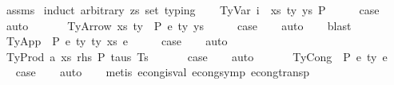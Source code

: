 \begin{isabellebody}
%
\isadelimproof
%
\endisadelimproof
%
\isatagproof
{}\isamarkupfalse%
\ assms\isanewline
{}\isamarkupfalse%
\ {\isacharparenleft}{\kern0pt}induct\ arbitrary{\isacharcolon}{\kern0pt}\ zs\ set{\isacharcolon}{\kern0pt}\ typing{\isacharparenright}{\kern0pt}\isanewline
\ \ \isamarkupfalse%
\ {\isacharparenleft}{\kern0pt}TyVar\ i\ {\isasymGamma}\ xs\ ty\ ys\ P{\isacharparenright}{\kern0pt}\isanewline
\ \ \isamarkupfalse%
\ \isamarkupfalse%
\ {\isacharquery}{\kern0pt}case\isanewline
\ \ \isamarkupfalse%
\ auto\isanewline
\ \ \isamarkupfalse%
\isanewline
{}\isamarkupfalse%
\isanewline
\ \ \isamarkupfalse%
\ {\isacharparenleft}{\kern0pt}TyArrow\ xs\ ty{}\ {\isasymGamma}\ P\ e\ ty{}\ ys{\isacharparenright}{\kern0pt}\isanewline
\ \ \isamarkupfalse%
\ \isamarkupfalse%
\ {\isacharquery}{\kern0pt}case\isanewline
\ \ \isamarkupfalse%
\ auto\isanewline
\ \ \isamarkupfalse%
\ blast\isanewline
{}\isamarkupfalse%
\isanewline
\ \ \isamarkupfalse%
\ {\isacharparenleft}{\kern0pt}TyApp\ {\isasymGamma}\ P\ e{}\ ty{}\ ty{}\ xs\ e{}{\isacharparenright}{\kern0pt}\isanewline
\ \ \isamarkupfalse%
\ \isamarkupfalse%
\ {\isacharquery}{\kern0pt}case\isanewline
\ \ \isamarkupfalse%
\ auto\isanewline
\ \ \isamarkupfalse%
\isanewline
{}\isamarkupfalse%
\isanewline
\ \ \isamarkupfalse%
\ {\isacharparenleft}{\kern0pt}TyProd\ a\ xs\ rhs\ P\ taus\ Ts\ {\isasymGamma}{\isacharparenright}{\kern0pt}\isanewline
\ \ \isamarkupfalse%
\ \isamarkupfalse%
\ {\isacharquery}{\kern0pt}case\isanewline
\ \ \isamarkupfalse%
\ auto\isanewline
\ \ \isamarkupfalse%
\isanewline
{}\isamarkupfalse%
\isanewline
\ \ \isamarkupfalse%
\ {\isacharparenleft}{\kern0pt}TyCong\ {\isasymGamma}\ P\ e{}\ ty\ e{}{\isacharparenright}{\kern0pt}\isanewline
\ \ \isamarkupfalse%
\ \isamarkupfalse%
\ {\isacharquery}{\kern0pt}case\isanewline
\ \ \isamarkupfalse%
\ auto\isanewline
\ \ \isamarkupfalse%
\ {\isacharparenleft}{\kern0pt}metis\ econg{\isacharunderscore}{\kern0pt}is{\isacharunderscore}{\kern0pt}val\ econg{\isacharunderscore}{\kern0pt}symp\ econg{\isacharunderscore}{\kern0pt}transp{\isacharparenright}{\kern0pt}\isanewline

\end{isabellebody}
